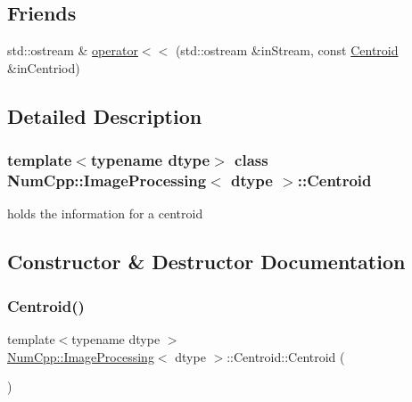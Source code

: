 \subsection*{Friends}
\begin{DoxyCompactItemize}
\item 
std\+::ostream \& \mbox{\hyperlink{class_num_cpp_1_1_image_processing_1_1_centroid_a5313d8a6a2d6a5fde55a8457650c54d3}{operator$<$$<$}} (std\+::ostream \&in\+Stream, const \mbox{\hyperlink{class_num_cpp_1_1_image_processing_1_1_centroid}{Centroid}} \&in\+Centriod)
\end{DoxyCompactItemize}


\subsection{Detailed Description}
\subsubsection*{template$<$typename dtype$>$\newline
class Num\+Cpp\+::\+Image\+Processing$<$ dtype $>$\+::\+Centroid}

holds the information for a centroid 

\subsection{Constructor \& Destructor Documentation}
\mbox{\label{class_num_cpp_1_1_image_processing_1_1_centroid_a75c8e9c6a256f31ca1df7c9ca069fd08}} 
\subsubsection{\texorpdfstring{Centroid()}{Centroid()}\hspace{0.1cm}{\footnotesize\ttfamily [1/2]}}
{\footnotesize\ttfamily template$<$typename dtype $>$ \\
\mbox{\hyperlink{class_num_cpp_1_1_image_processing}{Num\+Cpp\+::\+Image\+Processing}}$<$ dtype $>$\+::Centroid\+::\+Centroid (\begin{DoxyParamCaption}{ }\end{DoxyParamCaption})\hspace{0.3cm}{\ttfamily [inline]}}

